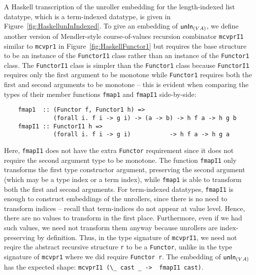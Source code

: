 A Haskell transcription of the unroller embedding for the length-indexed
list datatype, which is a term-indexed datatype, is given
in Figure~\ref{fig:HaskellunInIndexed}. To give an embedding of
$\mathsf{unIn}_{(V A)}$, we define another version of Mendler-style course-of-values
recursion combinator \texttt{mcvprI1} similar to \texttt{mcvpr1}
in Figure~\ref{fig:HaskellFunctor1} but requires the base structure
to be an instance of the \texttt{FunctorI1} class rather than an instance of
the \texttt{Functor1} class. The \texttt{FunctorI1} class is simpler than
the \texttt{Functor1} class because \texttt{FunctorI1} requires only the first
argument to be monotone while \texttt{Functor1} requires both the first and
second arguments to be monotone -- this is evident when comparing
the types of their member functions \texttt{fmap1} and \texttt{fmapI1}
side-by-side:
\begin{lstlisting}
    fmap1  :: (Functor f, Functor1 h) =>
              (forall i. f i -> g i) -> (a -> b) -> h f a -> h g b
    fmapI1 :: FunctorI1 h =>
              (forall i. f i -> g i)           -> h f a -> h g a
\end{lstlisting}
Here, \texttt{fmapI1} does not have the extra \texttt{Functor}
requirement since it does not require the second argument type
to be monotone. The function \texttt{fmapI1} only transforms the first type
constructor argument, preserving the second argument (which may be
a type index or a term index), while \texttt{fmap1} is able to transform
both the first and second arguments. For term-indexed datatypes,
\texttt{fmapI1} is enough to construct embeddings of the unrollers,
since there is no need to transform indices -- recall that term-indices
do not appear at value level. Hence, there are no values to transform
in the first place. Furthermore, even if we had such values, we need not
transform them anyway because unrollers are index-preserving by definition.
Thus, in the type signature of \texttt{mcvprI1}, we need not reqire
the abstract recursive structure \texttt{r} to be a \texttt{Functor},
unlike in the type signature of \texttt{mcvpr1} where we did require
\texttt{Functor r}. The embedding of $\mathsf{unIn}_{(V A)}$ has the  expected shape:
\lstinline$mcvprI1 (\_ cast _ ->  fmapI1 cast)$.


